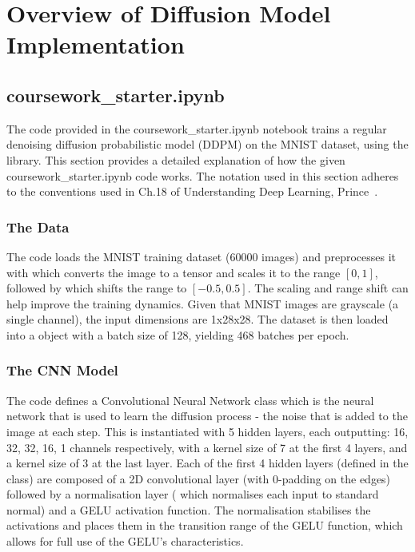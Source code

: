 
\section{Overview of Diffusion Model Implementation}\label{sec:q1a}
\subsection{coursework\_starter.ipynb}\label{subsec:q1a}
The code provided in the coursework\_starter.ipynb notebook trains a regular denoising diffusion probabilistic model
(DDPM) on the MNIST dataset, using the  library.
This section provides a detailed explanation of how the given coursework\_starter.ipynb code works.
The notation used in this section adheres to the conventions used in Ch.18 of Understanding Deep Learning, Prince~\cite{prince}.

\subsubsection{The Data}\label{subsubsec:data}
The code loads the MNIST training dataset (60000 images) and preprocesses it with  which converts
the image to a tensor and scales it to the range $[0, 1]$, followed by 
which shifts the range to $[-0.5, 0.5]$.
The scaling and range shift can help improve the training dynamics.
Given that MNIST images are grayscale (a single channel), the input dimensions are 1x28x28.
The dataset is then loaded into a  object with a batch size of 128, yielding 468 batches per
epoch.

\subsubsection{The CNN Model}\label{subsubsec:cnn-model}
The code defines a Convolutional Neural Network  class which is the neural network that is used to
learn the diffusion process - the noise that is added to the image at each step.
This is instantiated with 5 hidden layers, each outputting: 16, 32, 32, 16, 1 channels respectively, with a kernel size
of 7 at the first 4 layers, and a kernel size of 3 at the last layer.
Each of the first 4 hidden layers (defined in the  class) are composed of a 2D convolutional layer
(with 0-padding on the edges) followed by a normalisation layer ( which normalises each input to
standard normal) and a GELU activation function.
The normalisation stabilises the activations and places them in the transition range of the GELU function, which allows
for full use of the GELU's characteristics.

